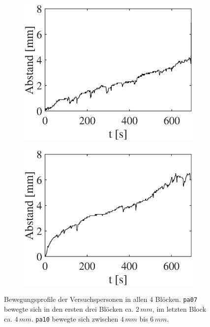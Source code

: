 \documentclass[doc,a4paper,12pt]{apa6}
\begin{document}
\begin{figure}
\begin{subfigure}[c]{0.23\textwidth}
    \label{img:bewegung:pa10:3}
  \end{subfigure}\hspace*{0.02\textwidth}
  \begin{subfigure}[c]{0.23\textwidth}
    \includegraphics[width=\textwidth]{ergebnisse/movement/pa10a4_mc_dist_movement.eps}
    \label{img:bewegung:pa10:4}
  \end{subfigure}\hspace*{0.02\textwidth}
  \begin{subfigure}[c]{0.23\textwidth}
    \includegraphics[width=\textwidth]{ergebnisse/movement/pa10a6_mc_dist_movement.eps}
    \label{img:bewegung:pa10:6}
  \end{subfigure}
  \captionsetup{justification=justified}
  \vspace*{3mm}
  \caption[Bewegungsprofile der Versuchspersonen]{Bewegungsprofile der Versuchspersonen in allen 4 Blöcken. \texttt{pa07} bewegte sich in den ersten drei Blöcken ca. $2\,mm$, im letzten Block ca. $4\,mm$. \texttt{pa10} bewegte sich zwischen $4\,mm$ bis $6\,mm$.}
  \label{img:bewegung}
\end{figure}
\end{document}
